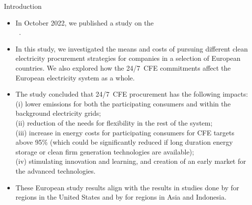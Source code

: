\begin{frame}{Introduction}

  {\footnotesize
  \begin{itemize}
  \item In October 2022, we published a study on the  \\
  \faGithub~. 
  
  \item In this study, we investigated the \alert{means and costs} of pursuing different clean electricity procurement strategies for companies in a selection of European countries. We also explored how the 24/7~CFE commitments \alert{affect the European electricity system} as a whole. 
  
  \item The study concluded that 24/7~CFE procurement has the following impacts: \\ 
  (i) lower emissions for both the participating consumers and within the background electricity grids;\\ 
  (ii) reduction of the needs for flexibility in the rest of the system; \\ 
  (iii) increase in energy costs for participating consumers for CFE targets above 95\% (which could be significantly reduced if long duration energy storage or clean firm generation technologies are available); \\ 
  (iv) stimulating innovation and learning, and creation of an early market for the advanced technologies.

  \item  These European study results align with the results in studies done by  for regions in the United States and by  for regions in Asia and Indonesia.

  \end{itemize}
  }

\end{frame}
  


